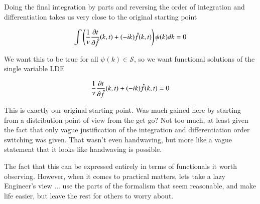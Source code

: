 \documentclass{article}
\newcommand{\Sw}[0]{\mathcal{S}}
\begin{document}
Doing the final integration by parts and reversing the order of integration and differentiation takes us very close to the original starting point

\begin{align*}
\int \left( \frac{1}{v} \frac{\partial{t}}{\partial {\hat{f}}}(k,t) + (-i k ) \hat{f}(k,t) \right) \psi(k) dk = 0
\end{align*}

We want this to be true for all $\psi(k) \in \Sw$, so we want functional solutions of the single variable LDE

\begin{align*}
\frac{1}{v} \frac{\partial{t}}{\partial {\hat{f}}}(k,t) + (-i k ) \hat{f}(k,t) = 0
\end{align*}

This is exactly our original starting point.  Was much gained here by starting from a distribution point of view from the get go?  Not too much, at least
given the fact that only vague justification of the integration and differentiation order switching was given.  That wasn't even handwaving, but more
like a vague statement that it looks like handwaving is possible.

The fact
that this can be expressed entirely in terms of functionals it worth observing.  However, when it comes to practical matters, lets take a lazy Engineer's view ... use the parts 
of the formalism that seem reasonable, and make life easier, but leave the rest for others to worry about. 



\end{document}
